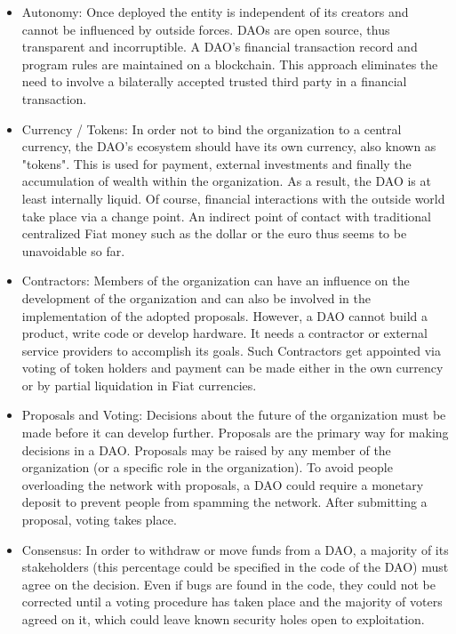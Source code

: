 \documentclass{scrartcl}
\begin{document}
    \begin{itemize}
    	\item Autonomy: \newline
    	Once deployed the entity is independent of its creators and cannot be influenced by outside forces. DAOs are open source, thus transparent and incorruptible. A DAO’s financial transaction record and program rules are maintained on a blockchain. This approach eliminates the need to involve a bilaterally accepted trusted third party in a financial transaction.
    	
    	\item Currency / Tokens: \newline
    	In order not to bind the organization to a central currency, the DAO's ecosystem should have its own currency, also known as "tokens". This is used for payment, external investments and finally the accumulation of wealth within the organization. As a result, the DAO is at least internally liquid. Of course, financial interactions with the outside world take place via a change point. An indirect point of contact with traditional centralized Fiat money such as the dollar or the euro thus seems to be unavoidable so far.
    	
    	\item Contractors: \newline
    	Members of the organization can have an influence on the development of the organization and can also be involved in the implementation of the adopted proposals. However, a DAO cannot build a product, write code or develop hardware. It needs a contractor or external service providers to accomplish its goals. Such Contractors get appointed via voting of token holders and payment can be made either in the own currency or by partial liquidation in Fiat currencies.
    	
    	\item Proposals and Voting: \newline
    	Decisions about the future of the organization must be made before it can develop further. Proposals are the primary way for making decisions in a DAO. Proposals may be raised by any member of the organization (or a specific role in the organization). To avoid people overloading the network with proposals, a DAO could require a monetary deposit to prevent people from spamming the network. After submitting a proposal, voting takes place. 
    	
    	\item Consensus: \newline
    	In order to withdraw or move funds from a DAO, a majority of its stakeholders (this percentage could be specified in the code of the DAO) must agree on the decision. Even if bugs are found in the code, they could not be corrected until a voting procedure has taken place and the majority of voters agreed on it, which could leave known security holes open to exploitation.
    	

\end{itemize}
\end{document}
